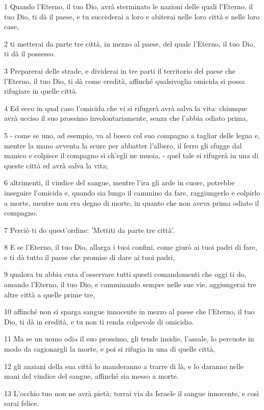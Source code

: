 \par 1 Quando l'Eterno, il tuo Dio, avrà sterminato le nazioni delle quali l'Eterno, il tuo Dio, ti dà il paese, e tu succederai a loro e abiterai nelle loro città e nelle loro case,
\par 2 ti metterai da parte tre città, in mezzo al paese, del quale l'Eterno, il tuo Dio, ti dà il possesso.
\par 3 Preparerai delle strade, e dividerai in tre parti il territorio del paese che l'Eterno, il tuo Dio, ti dà come eredità, affinché qualsivoglia omicida si possa rifugiare in quelle città.
\par 4 Ed ecco in qual caso l'omicida che vi si rifugerà avrà salva la vita: chiunque avrà ucciso il suo prossimo involontariamente, senza che l'abbia odiato prima,
\par 5 - come se uno, ad esempio, va al bosco col suo compagno a tagliar delle legna e, mentre la mano avventa la scure per abbatter l'albero, il ferro gli sfugge dal manico e colpisce il compagno sì ch'egli ne muoia, - quel tale si rifugerà in una di queste città ed avrà salva la vita;
\par 6 altrimenti, il vindice del sangue, mentre l'ira gli arde in cuore, potrebbe inseguire l'omicida e, quando sia lungo il cammino da fare, raggiungerlo e colpirlo a morte, mentre non era degno di morte, in quanto che non aveva prima odiato il compagno.
\par 7 Perciò ti do quest'ordine: 'Mettiti da parte tre città'.
\par 8 E se l'Eterno, il tuo Dio, allarga i tuoi confini, come giurò ai tuoi padri di fare, e ti dà tutto il paese che promise di dare ai tuoi padri,
\par 9 qualora tu abbia cura d'osservare tutti questi comandamenti che oggi ti do, amando l'Eterno, il tuo Dio, e camminando sempre nelle sue vie, aggiungerai tre altre città a quelle prime tre,
\par 10 affinché non si sparga sangue innocente in mezzo al paese che l'Eterno, il tuo Dio, ti dà in eredità, e tu non ti renda colpevole di omicidio.
\par 11 Ma se un uomo odia il suo prossimo, gli tende insidie, l'assale, lo percuote in modo da cagionargli la morte, e poi si rifugia in una di quelle città,
\par 12 gli anziani della sua città lo manderanno a trarre di là, e lo daranno nelle mani del vindice del sangue, affinché sia messo a morte.
\par 13 L'occhio tuo non ne avrà pietà; torrai via da Israele il sangue innocente, e così sarai felice.
